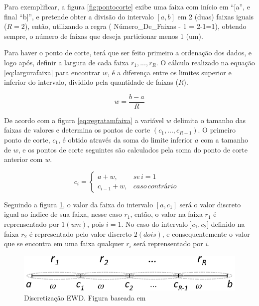 Para exemplificar, a figura \ref{fig:pontocorte} exibe uma faixa com início em ``[a'', e final ``b]'', e pretende obter a divisão do intervalo ${[a,b]}$ em 2 (duas) faixas iguais (${R=2}$), então, utilizando a regra ( Número\_De\_Faixas - 1 =  2-1=1), obtendo sempre, o número de faixas que deseja particionar menos 1 (um).

Para haver o ponto de corte, terá que ser feito primeiro a ordenação dos dados, e logo após, definir a largura de cada faixa ${r_1,...,r_R}$. O cálculo realizado na equação \ref{eq:largurafaixa} para encontrar ${w}$, é a diferença entre os limites superior e inferior do intervalo, dividido pela quantidade de faixas (${R}$).

\begin{equation}
 w = \frac{b-a}{R}
 \label{eq:largurafaixa}
\end{equation}

De acordo com a figura \ref{eq:regratamfaixa} a variável ${w}$ delimita o tamanho das faixas de valores e determina os pontos de corte ${(c_1,...,c_{R-1})}$. O primeiro ponto de corte, ${c_1}$, é obtido através da soma do limite inferior ${a}$ com a tamanho de ${w}$, e os pontos de corte seguintes são calculados pela soma do ponto de corte anterior com ${w}$.

\begin{equation}
c_i=\left\{\begin{matrix}
a+w, & se\, i=1 & \\ 
c_{i-1}+w,  & caso\, contrário & 
\end{matrix}\right.
 \label{eq:regratamfaixa}
\end{equation}


Seguindo a figura \ref{fig:faixasEWD}, o valor da faixa do intervalo ${[a,c_1]}$ será o valor discreto igual ao índice de sua faixa, nesse caso ${r_1}$, então, o valor na faixa ${r_1}$ é reprensentado por ${1(um)}$, pois  ${i=1}$. No caso do intervalo ${]c_1,c_2]}$ definido na faixa  ${r_2}$ é representado pelo valor discreto ${2(dois)}$, e consequentemente o valor que se encontra em uma faixa qualquer ${r_i}$ será reprensentado por ${i}$.

\begin{figure}[h] 
        \centering
        \includegraphics[scale=0.6]{figs/discretizacaoEWD.png}
        \caption[Discretização EWD]{Discretização EWD. Figura baseada em \cite{Lopes2016}}%
        \label{fig:faixasEWD}
\end{figure}

